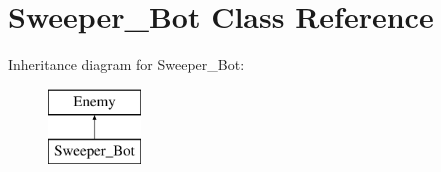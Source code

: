 \hypertarget{class_sweeper___bot}{}\section{Sweeper\+\_\+\+Bot Class Reference}
\label{class_sweeper___bot}
Inheritance diagram for Sweeper\+\_\+\+Bot\+:\begin{figure}[H]
\begin{center}
\leavevmode
\includegraphics[height=2.000000cm]{class_sweeper___bot}
\end{center}
\end{figure}
